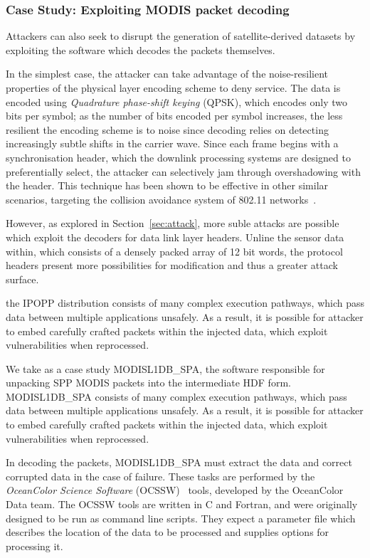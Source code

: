 
\subsubsection{Case Study: Exploiting MODIS packet decoding}

Attackers can also seek to disrupt the generation of satellite-derived datasets by exploiting the software which decodes the packets themselves.

In the simplest case, the attacker can take advantage of the noise-resilient properties of the physical layer encoding scheme to deny service.
The data is encoded using \textit{Quadrature phase-shift keying} (QPSK), which encodes only two bits per symbol; as the number of bits encoded per symbol increases, the less resilient the encoding scheme is to noise since decoding relies on detecting increasingly subtle shifts in the carrier wave.
Since each frame begins with a synchronisation header, which the downlink processing systems are designed to preferentially select, the attacker can selectively jam through overshadowing with the header.
This technique has been shown to be effective in other similar scenarios, targeting the collision avoidance system of 802.11 networks~\cite{gummadi2007understanding}.


However, as explored in Section~\ref{sec:attack}, more suble attacks are possible which exploit the decoders for data link layer headers.
Unline the sensor data within, which consists of a densely packed array of 12 bit words, the protocol headers present more possibilities for modification and thus a greater attack surface.

the IPOPP distribution consists of many complex execution pathways, which pass data between multiple applications unsafely.
As a result, it is possible for attacker to embed carefully crafted packets within the injected data, which exploit vulnerabilities when reprocessed.

We take as a case study MODISL1DB\_SPA, the software responsible for unpacking SPP MODIS packets into the intermediate HDF form.
MODISL1DB\_SPA consists of many complex execution pathways, which pass data between multiple applications unsafely.
As a result, it is possible for attacker to embed carefully crafted packets within the injected data, which exploit vulnerabilities when reprocessed.

In decoding the packets, MODISL1DB\_SPA must extract the data and correct corrupted data in the case of failure.
These tasks are performed by the \textit{OceanColor Science Software} (OCSSW)~\cite{ocssw} tools, developed by the OceanColor Data team.
The OCSSW tools are written in C and Fortran, and were originally designed to be run as command line scripts.
They expect a parameter file which describes the location of the data to be processed and supplies options for processing it.

